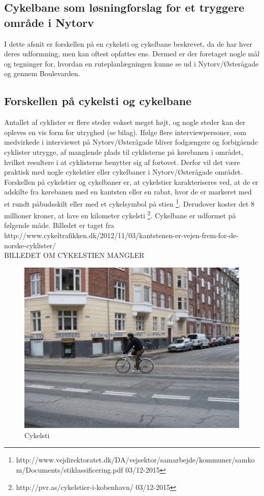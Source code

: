 \subsection{Cykelbane som løsningforslag for et tryggere område i Nytorv}
\label{sub:Cykelbane_som_loesningforslag_for_et_tryggere_omraade_i_Nytorv}
I dette afsnit er forskellen på en cykelsti og cykelbane beskrevet, da de har hver deres udformning, men kan oftest opfattes ens.  Dermed er der foretaget nogle mål og tegninger for, hvordan en ruteplanlægningen kunne se ud i Nytorv/Østerågade og gennem Boulevarden.

\subsection{Forskellen på cykelsti og cykelbane}
\label{forskelpaacykelsti}
Antallet af cyklister er flere steder vokset meget højt, og nogle steder kan der opleves en vis form for utryghed (se bilag). Ifølge flere interviewpersoner, som medvirkede i interviewet på Nytorv/Østerågade bliver fodgængere og forbigående cyklister utrygge, af manglende plads til cyklisterne på kørebanen i området, hvilket resultere i at cyklisterne benytter sig af fortovet. Derfor vil det være praktisk med nogle cykelstier eller cykelbaner i Nytorv/Østerågade området.
Forskellen på cykelstier og cykelbaner er, at cykelstier karakteriseres ved, at de er adskilte fra kørebanen med en kantsten eller en rabat, hvor de er markeret med et rundt påbudsskilt eller med et cykelsymbol på stien \footnote{http://www.vejdirektoratet.dk/DA/vejsektor/samarbejde/kommuner/samkom/Documents/stiklassificering.pdf 03/12-2015}.  Derudover koster det 8 millioner kroner, at lave en kilometer cykelsti \footnote{http://pvr.as/cykelstier-i-kobenhavn/ 03/12-2015}.  Cykelbane er udformet på følgende måde. Billedet er taget fra
http://www.cykeltrafikken.dk/2012/11/03/kantstenen-er-vejen-frem-for-de-norske-cyklister/
\\

BILLEDET OM CYKELSTIEN MANGLER
\begin{figure}[htbp]
   \label{fig:Cykelsti}
   \centering
   \begin{adjustbox}{max width=\textwidth}
     \includegraphics[scale=0.5]{billederogfigur/cykelsti.png}
  \end{adjustbox}
   \caption{Cykelsti}
 \end{figure}


